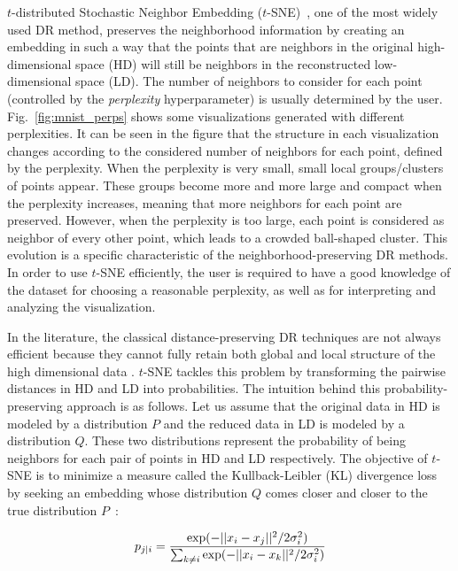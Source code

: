 $t$-distributed Stochastic Neighbor Embedding ($t$-SNE)~\cite{maaten2008tsne}, one of the most widely used DR method, preserves the neighborhood information by creating an embedding in such a way that the points that are neighbors in the original high-dimensional space (HD) will still be neighbors in the reconstructed low-dimensional space (LD). 
The number of neighbors to consider for each point (controlled by the \emph{perplexity} hyperparameter) is usually determined by the user.
Fig.~\ref{fig:mnist_perps} shows some visualizations generated with different perplexities. 
It can be seen in the figure that the structure in each visualization changes according to the considered number of neighbors for each point, defined by the perplexity. When the perplexity is very small, small local groups/clusters of points appear. These groups become more and more large and compact when the perplexity increases, meaning that more neighbors for each point are preserved. However, when the perplexity is too large, each point is considered as neighbor of every other point, which leads to a crowded ball-shaped cluster. This evolution is a specific characteristic of the neighborhood-preserving DR methods. In order to use $t$-SNE efficiently, the user is required to have a good knowledge of the dataset for choosing a reasonable perplexity, as well as for interpreting and analyzing the visualization.

In the literature, the classical distance-preserving DR techniques are not always efficient because they cannot fully retain both global and local structure of the high dimensional data \cite{maaten2008tsne, van2009comparativeReview}. $t$-SNE tackles this problem by transforming the pairwise distances in HD and LD into probabilities. The intuition behind this probability-preserving approach is as follows.
Let us assume that the original data in HD is modeled by a distribution $P$ and the reduced data in LD is modeled by a distribution $Q$.
These two distributions represent the probability of being neighbors for each pair of points in HD and LD respectively.
The objective of $t$-SNE is to minimize a measure called the Kullback-Leibler (KL) divergence loss by seeking an embedding whose distribution $Q$ comes closer and closer to the true distribution $P$~\cite{maaten2008tsne}:

\begin{equation}\label{eq:p_j|i}
    p_{j|i} = \frac{\textnormal{exp}(-||x_i - x_j||^2/2\sigma_i^2)}{\sum_{k\not=i}\textnormal{exp}(-||x_i - x_k||^2/2\sigma_i^2)}
\end{equation}


